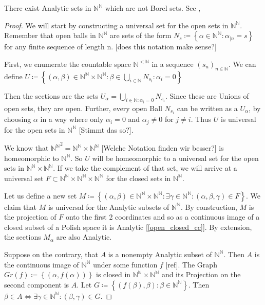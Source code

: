 \documentclass[10pt, a4paper, titlepage]{article}
\numberwithin{equation}{section}
\begin{document}
\begin{theorem}[Souslin]
	There exist Analytic sets in $\mathbb{N}^\mathbb{N}$ which are not Borel sets. See \cite{kechris1995}, \cite{cohn2013}
\end{theorem}
\begin{proof}
We will start by constructing a universal set for the open sets in $\mathbb{N}^\mathbb{N}$. 
Remember that open balls in $\mathbb{N}^\mathbb{N}$ are sets of the form $N_s \coloneq \left\{ \alpha \in \mathbb{N}^\mathbb{N} : \alpha_{|n} = s \right\} $ for any finite sequence of length n. 
[does this notation make sense?]

First, we enumerate the countable space $\mathbb{N}^{<\mathbb{N}}$ in a sequence $\left( s_n \right)_{n \in \mathbb{N}} $.
We can define $U\coloneq \left\{ \left( \alpha,\beta \right) \in \mathbb{N}^\mathbb{N} \times \mathbb{N}^\mathbb{N}: \beta \in \bigcup_{i \in  \mathbb{N}} N_{s_i}: \alpha_i = 0 \right\} $

Then the sections are the sets $U_{\alpha} = \bigcup_{i \in \mathbb{N}: \alpha_i = 0}  N_{s_i}$.
Since these are Unions of open sets, they are open. 
Further, every open Ball $N_{s_i}$ can be written as a $U_\alpha$, by choosing $\alpha$ in a way where only  $\alpha_i =0$ and  $\alpha_j \neq 0 $ for  $j \neq i$.
Thus $U$ is universal for the open sets in  $\mathbb{N}^\mathbb{N}$ [Stimmt das so?].

We know that ${\mathbb{N}^\mathbb{N}}^2 = \mathbb{N}^\mathbb{N} \times \mathbb{N}^\mathbb{N}$ [Welche Notation finden wir besser?] is homeomorphic to  $\mathbb{N}^\mathbb{N}$.
So $U$ will be homeomorphic to a universal set for the open sets in  $\mathbb{N}^\mathbb{N} \times \mathbb{N}^\mathbb{N}$.
If we take the complement of that set, we will arrive at a
universal set $F \subset \mathbb{N}^\mathbb{N} \times \mathbb{N}^\mathbb{N}
\times \mathbb{N}^\mathbb{N}$ for the closed sets in $\mathbb{N}^\mathbb{N}$. 

Let us define a new set $M \coloneq \left\{ \left( \alpha,\beta \right) \in
\mathbb{N}^\mathbb{N} \times \mathbb{N}^\mathbb{N} : \exists \gamma \in
\mathbb{N}^\mathbb{N}: \left( \alpha, \beta, \gamma \right) \in F  \right\}  $.
We claim that $M$ is universal for the Analytic subsets of
$\mathbb{N}^\mathbb{N}$.
By construction, $M$ is the projection of $F$ onto the first 2 coordinates and
so as a continuous image of a closed subset of a Polish space it is Analytic
[\autoref{open_closed_cc}]. 
By extension, the sections $M_{\alpha}$ are also Analytic.

Suppose on the contrary, that $A$ is a nonempty Analytic subset of $\mathbb{N}^\mathbb{N}$.
Then $A$ is the continuous image of  $\mathbb{N}^\mathbb{N}$ under some function
$f$ [ref].  
The Graph $Gr\left( f \right) \coloneq \left\{ \left( \alpha, f\left( \alpha
\right)  \right)  \right\} $ is closed in $\mathbb{N}^\mathbb{N} \times
\mathbb{N}^\mathbb{N}$ and its Projection on the second component is $A$.
Let $G \coloneq \left\{ \left( f\left( \beta\right), \beta \right) : \beta
\in \mathbb{N}^\mathbb{N} \right\} $. 
Then $\beta \in A \iff \exists \gamma \in \mathbb{N}^\mathbb{N}: \left( \beta,
\gamma \right) \in G $.


\end{proof}
\end{document}
